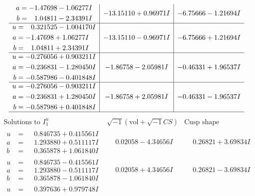 \documentclass[1p]{elsarticle_modified}
\theoremstyle{definition}
\newcommand{\I}{\sqrt{-1}}
\begin{document}
$$\begin{array}{c|c|c}
\begin{aligned}
a &= -1.47698 - 1.06277 I \\
b &= \phantom{-}1.04811 - 2.34391 I\end{aligned}
 & -13.15110 + 0.96971 I & -6.75666 - 1.21694 I \\ \hline\begin{aligned}
u &= \phantom{-}0.321525 - 1.004170 I \\
a &= -1.47698 + 1.06277 I \\
b &= \phantom{-}1.04811 + 2.34391 I\end{aligned}
 & -13.15110 - 0.96971 I & -6.75666 + 1.21694 I \\ \hline\begin{aligned}
u &= -0.276056 + 0.903211 I \\
a &= -0.236831 - 1.280450 I \\
b &= -0.587986 - 0.401848 I\end{aligned}
 & -1.86758 - 2.05981 I & -0.46331 + 1.96537 I \\ \hline\begin{aligned}
u &= -0.276056 - 0.903211 I \\
a &= -0.236831 + 1.280450 I \\
b &= -0.587986 + 0.401848 I\end{aligned}
 & -1.86758 + 2.05981 I & -0.46331 - 1.96537 I\\
 \hline 
 \end{array}$$\newpage$$\begin{array}{c|c|c}  
\text{Solutions to }I^u_{1}& \I (\text{vol} + \sqrt{-1}CS) & \text{Cusp shape}\\
 \hline 
\begin{aligned}
u &= \phantom{-}0.846735 + 0.415561 I \\
a &= \phantom{-}1.293880 + 0.511117 I \\
b &= \phantom{-}0.365878 + 1.061840 I\end{aligned}
 & \phantom{-}0.02058 - 4.34656 I & \phantom{-}0.26821 + 3.69834 I \\ \hline\begin{aligned}
u &= \phantom{-}0.846735 - 0.415561 I \\
a &= \phantom{-}1.293880 - 0.511117 I \\
b &= \phantom{-}0.365878 - 1.061840 I\end{aligned}
 & \phantom{-}0.02058 + 4.34656 I & \phantom{-}0.26821 - 3.69834 I \\ \hline\begin{aligned}
u &= \phantom{-}0.397636 + 0.979748 I \\

\end{aligned}
\end{array}$$
\end{document}
